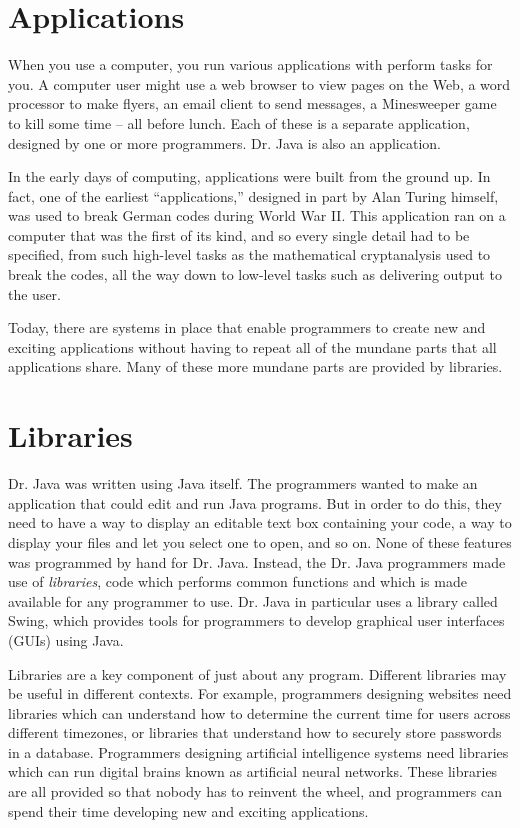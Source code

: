 \section{Applications}

When you use a computer, you run various applications with perform tasks for you. A computer user might use a web browser to view pages on the Web, a word processor to make flyers, an email client to send messages, a Minesweeper game to kill some time -- all before lunch. Each of these is a separate application, designed by one or more programmers. Dr. Java is also an application.

In the early days of computing, applications were built from the ground up. In fact, one of the earliest ``applications,'' designed in part by Alan Turing himself, was used to break German codes during World War II. This application ran on a computer that was the first of its kind, and so every single detail had to be specified, from such high-level tasks as the mathematical cryptanalysis used to break the codes, all the way down to low-level tasks such as delivering output to the user.

Today, there are systems in place that enable programmers to create new and exciting applications without having to repeat all of the mundane parts that all applications share. Many of these more mundane parts are provided by libraries.

\section{Libraries}

Dr. Java was written using Java itself. The programmers wanted to make an application that could edit and run Java programs. But in order to do this, they need to have a way to display an editable text box containing your code, a way to display your files and let you select one to open, and so on. None of these features was programmed by hand for Dr. Java. Instead, the Dr. Java programmers made use of \emph{libraries}, code which performs common functions and which is made available for any programmer to use. Dr. Java in particular uses a library called Swing, which provides tools for programmers to develop graphical user interfaces (GUIs) using Java.

Libraries are a key component of just about any program. Different libraries may be useful in different contexts. For example, programmers designing websites need libraries which can understand how to determine the current time for users across different timezones, or libraries that understand how to securely store passwords in a database. Programmers designing artificial intelligence systems need libraries which can run digital brains known as artificial neural networks. These libraries are all provided so that nobody has to reinvent the wheel, and programmers can spend their time developing new and exciting applications.

